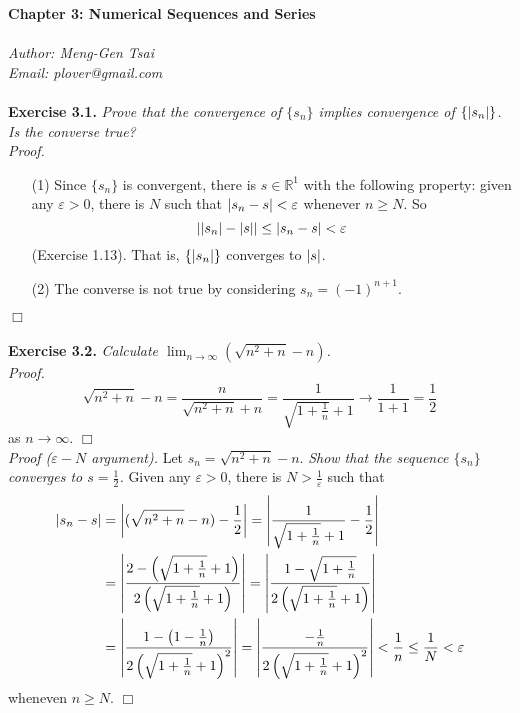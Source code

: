 \documentclass{article}
\begin{document}
\textbf{\Large Chapter 3: Numerical Sequences and Series} \\\\



\emph{Author: Meng-Gen Tsai} \\
\emph{Email: plover@gmail.com} \\\\



\textbf{Exercise 3.1.}
\emph{Prove that the convergence of $\{s_n\}$ implies
convergence of $\{\abs{s_n}\}$.  Is the converse true?} \\

\emph{Proof.}
\begin{enumerate}
\item[(1)]
Since $\{s_n\}$ is convergent, there is $s \in \mathbb{R}^1$
with the following property:
given any $\varepsilon > 0$, there is $N$ such that
$\abs{s_n - s} < \varepsilon$ whenever $n \geq N$.
So
$$\abs{\abs{s_n}-\abs{s}} \leq \abs{s_n - s}  < \varepsilon$$
(Exercise 1.13). That is,
$\{\abs{s_n}\}$ converges to $\abs{s}$.
\item[(2)]
The converse is not true by considering $s_n = (-1)^{n+1}$.
\end{enumerate}
$\Box$ \\\\






\textbf{Exercise 3.2.}
\emph{Calculate $\lim_{n \to \infty}(\sqrt{n^2 + n} - n)$.} \\

\emph{Proof.}
$$\sqrt{n^2 + n} - n
= \frac{n}{\sqrt{n^2+n} + n}
= \frac{1}{\sqrt{1+\frac{1}{n}} + 1} \to \frac{1}{1+1} = \frac{1}{2}$$
as $n \to \infty$.
$\Box$ \\

\emph{Proof ($\varepsilon-N$ argument).}
Let $s_n = \sqrt{n^2 + n} - n$.
\emph{Show that the sequence $\{s_n\}$ converges to $s = \frac{1}{2}$.}
Given any $\varepsilon > 0$, there is $N > \frac{1}{\varepsilon}$ such that
\begin{align*}
\abs{s_n - s}
&= \abs{(\sqrt{n^2 + n} - n) - \frac{1}{2}}
= \abs{\frac{1}{\sqrt{1+\frac{1}{n}} + 1} - \frac{1}{2}} \\
&= \abs{
\frac{2-\left(\sqrt{1+\frac{1}{n}} + 1\right)}
{2\left(\sqrt{1+\frac{1}{n}} + 1\right)}
}
= \abs{
\frac{1-\sqrt{1+\frac{1}{n}}}
{2\left(\sqrt{1+\frac{1}{n}} + 1\right)}
} \\
&= \abs{
\frac{1 - \left(1- \frac{1}{n}\right)}
{2\left(\sqrt{1+\frac{1}{n}} + 1\right)^2}}
= \abs{
\frac{- \frac{1}{n}}
{2\left(\sqrt{1+\frac{1}{n}} + 1\right)^2}}
< \frac{1}{n}
\leq \frac{1}{N}
< \varepsilon
\end{align*}
wheneven $n \geq N$.
$\Box$ \\\\
\end{document}
